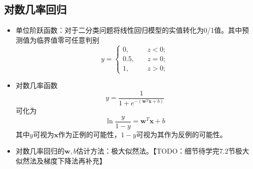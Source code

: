 \documentclass{ctexart}
\begin{document}
				\subsection{对数几率回归}
					\begin{itemize}
						\item 单位阶跃函数：对于二分类问题将线性回归模型的实值转化为0/1值。其中预测值为临界值零可任意判别\[y=\left\{\begin{aligned}
						0,\quad & z < 0; \\
						0.5,\quad & z = 0; \\
						1,\quad & z > 0;
						\end{aligned}\right.\]
						\item 对数几率函数\[y=\frac{1}{1+e^{-(\bm{w}^T\bm{x}+b)}}\]可化为\[\ln\frac{y}{1-y}=\bm{w}^T\bm{x}+b\]其中$y$可视为$\bm{x}$作为正例的可能性，$1-y$可视为其作为反例的可能性。
						\item 对数几率回归的$\bm{w},b$估计方法：极大似然法。【TODO：细节待学完7.2节极大似然法及梯度下降法再补充】
					\end{itemize}
\end{document}
